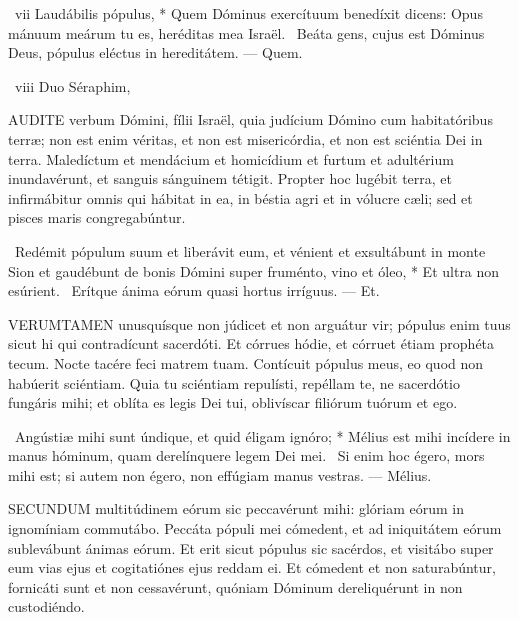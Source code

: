 \R\ vii Laudábilis pópulus, * Quem Dóminus exercítuum benedíxit dicens: Opus mánuum meárum tu es, heréditas mea Israël. \V\ Beáta gens, cujus est Dóminus Deus, pópulus eléctus in hereditátem. — Quem.

\R\ viii Duo Séraphim, 




\lettrine[lines=2]{A}{UDITE} verbum Dómini, fílii Israël, quia judícium Dómino cum habitatóribus terræ; non est enim véritas, et non est misericórdia, et non est sciéntia Dei in terra. Maledíctum et mendácium et homicídium et furtum et adultérium inundavérunt, et sanguis sánguinem tétigit. Propter hoc lugébit terra, et infirmábitur omnis qui hábitat in ea, in béstia agri et in vólucre cæli; sed et pisces maris congregabúntur.

\R\ Redémit pópulum suum et liberávit eum, et vénient et exsultábunt in monte Sion et gaudébunt de bonis Dómini super fruménto, vino et óleo, * Et ultra non esúrient. \V\ Erítque ánima eórum quasi hortus irríguus. — Et.


\lettrine[lines=2]{V}{ERUMTAMEN} unusquísque non júdicet et non arguátur vir; pópulus enim tuus sicut hi qui contradícunt sacerdóti. Et córrues hódie, et córruet étiam prophéta tecum. Nocte tacére feci matrem tuam. Contícuit pópulus meus, eo quod non habúerit sciéntiam. Quia tu sciéntiam repulísti, repéllam te, ne sacerdótio fungáris mihi; et oblíta es legis Dei tui, oblivíscar filiórum tuórum et ego.

\R\ Angústiæ mihi sunt úndique, et quid éligam ignóro; * Mélius est mihi incídere in manus hóminum, quam derelínquere legem Dei mei. \V\ Si enim hoc égero, mors mihi est; si autem non égero, non effúgiam manus vestras. — Mélius.



\lettrine[lines=2]{S}{ECUNDUM} multitúdinem eórum sic peccavérunt mihi: glóriam eórum in ignomíniam commutábo. Peccáta pópuli mei cómedent, et ad iniquitátem eórum sublevábunt ánimas eórum. Et erit sicut pópulus sic sacérdos, et visitábo super eum vias ejus et cogitatiónes ejus reddam ei. Et cómedent et non saturabúntur, fornicáti sunt et non cessavérunt, quóniam Dóminum dereliquérunt in non custodiéndo.

